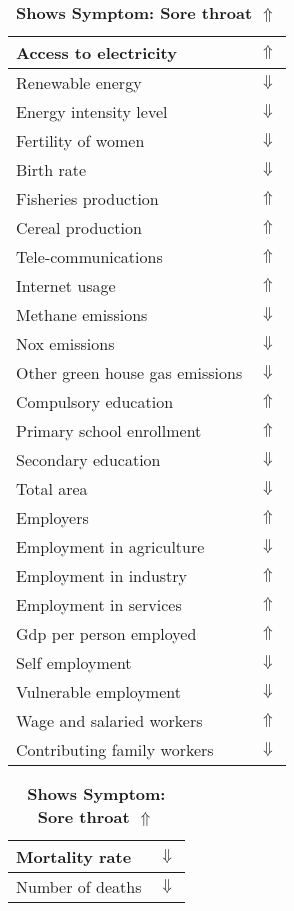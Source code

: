 \documentclass[12pt,notitlepage,oneside]{report}
\begin{document}
\clearpage
\begin{table}[!htb]
\caption{\textbf{Shows Symptom: Sore throat $\Uparrow$}}
\centering
\label{Correlated Socio-economic Factors0}
\begin{tabular}{|l|l|}
\hline
Access to electricity & $\Uparrow$\\ \hline
Renewable energy & $\Downarrow$\\ \hline
Energy intensity level & $\Downarrow$\\ \hline
Fertility of women & $\Downarrow$\\ \hline
Birth rate & $\Downarrow$\\ \hline
Fisheries production & $\Uparrow$\\ \hline
Cereal production & $\Uparrow$\\ \hline
Tele-communications & $\Uparrow$\\ \hline
Internet usage & $\Uparrow$\\ \hline
Methane emissions & $\Downarrow$\\ \hline
Nox emissions & $\Downarrow$\\ \hline
Other green house gas emissions & $\Downarrow$\\ \hline
Compulsory education & $\Uparrow$\\ \hline
Primary school enrollment & $\Uparrow$\\ \hline
Secondary education & $\Downarrow$\\ \hline
Total area & $\Downarrow$\\ \hline
Employers & $\Uparrow$\\ \hline
Employment in agriculture & $\Downarrow$\\ \hline
Employment in industry & $\Uparrow$\\ \hline
Employment in services & $\Uparrow$\\ \hline
Gdp per person employed & $\Uparrow$\\ \hline
Self employment & $\Downarrow$\\ \hline
Vulnerable employment & $\Downarrow$\\ \hline
Wage and salaried workers & $\Uparrow$\\ \hline
Contributing family workers & $\Downarrow$\\ \hline
\end{tabular}
\begin{tabular}{|l|l|}
\hline
Mortality rate & $\Downarrow$\\ \hline
Number of deaths & $\Downarrow$\\ \hline

\end{tabular}
\end{table}
\end{document}
